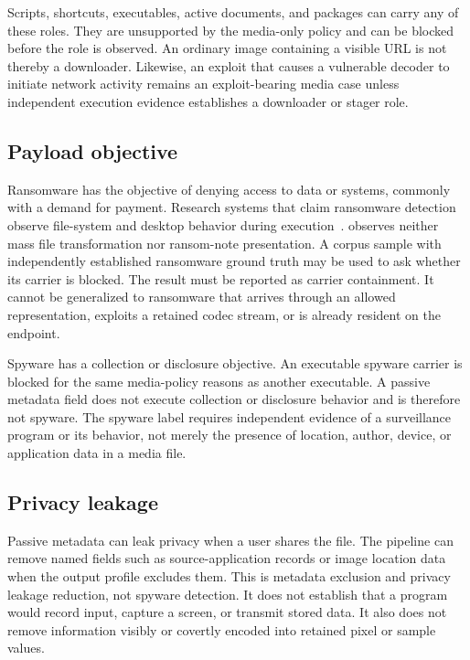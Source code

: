 Scripts, shortcuts, executables, active documents, and packages can carry any
of these roles. They are unsupported by the media-only policy and can be
blocked before the role is observed. An ordinary image containing a visible URL
is not thereby a downloader. Likewise, an exploit that causes a vulnerable
decoder to initiate network activity remains an exploit-bearing media case
unless independent execution evidence establishes a downloader or stager role.

\subsection{Payload objective}

Ransomware has the objective of denying access to data or systems, commonly
with a demand for payment. Research systems that claim ransomware detection
observe file-system and desktop behavior during execution~\cite{kharraz2016,
scaife2016}. \AFD{} observes neither mass file transformation nor ransom-note
presentation. A corpus sample with independently established ransomware ground
truth may be used to ask whether its carrier is blocked. The result must be
reported as carrier containment. It cannot be generalized to ransomware that
arrives through an allowed representation, exploits a retained codec stream,
or is already resident on the endpoint.

Spyware has a collection or disclosure objective. An executable spyware
carrier is blocked for the same media-policy reasons as another executable. A
passive metadata field does not execute collection or disclosure behavior and
is therefore not spyware. The spyware label requires independent evidence of a
surveillance program or its behavior, not merely the presence of location,
author, device, or application data in a media file.

\subsection{Privacy leakage}

Passive metadata can leak privacy when a user shares the file. The pipeline can
remove named fields such as source-application records or image location data
when the output profile excludes them. This is metadata exclusion and privacy
leakage reduction, not spyware detection. It does not establish that a program
would record input, capture a screen, or transmit stored data. It also does not
remove information visibly or covertly encoded into retained pixel or sample
values.

